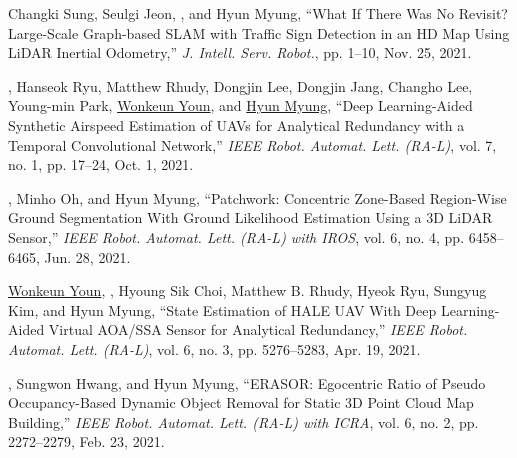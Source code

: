 \begin{pubSubsectionNum}
    \item Changki Sung, Seulgi Jeon, \hyungtaelim, and Hyun Myung, ``What If There Was No Revisit? Large-Scale Graph-based SLAM with Traffic Sign Detection in an HD Map Using LiDAR Inertial Odometry,'' \textit{J. Intell. Serv. Robot.}, pp. 1--10, Nov. 25, 2021.
    \item \hyungtaelim, Hanseok Ryu, Matthew Rhudy, Dongjin Lee, Dongjin Jang, Changho Lee, Young-min Park, \underline{Wonkeun Youn}, and \underline{Hyun Myung}, ``Deep Learning-Aided Synthetic Airspeed Estimation of UAVs for Analytical Redundancy with a Temporal Convolutional Network,'' \textit{IEEE Robot. Automat. Lett. (RA-L)}, vol. 7, no. 1, pp. 17--24, Oct. 1, 2021.
    \item \hyungtaelim, Minho Oh, and Hyun Myung, ``Patchwork: Concentric Zone-Based Region-Wise Ground Segmentation With Ground Likelihood Estimation Using a 3D LiDAR Sensor,'' \textit{IEEE Robot. Automat. Lett. (RA-L) with IROS}, vol. 6, no. 4, pp. 6458--6465, Jun. 28, 2021.
    \item \underline{Wonkeun Youn}, \underline{\hyungtaelim}, Hyoung Sik Choi, Matthew B. Rhudy, Hyeok Ryu, Sungyug Kim, and Hyun Myung, ``State Estimation of HALE UAV With Deep Learning-Aided Virtual AOA/SSA Sensor for Analytical Redundancy,'' \textit{IEEE Robot. Automat. Lett. (RA-L)}, vol. 6, no. 3, pp. 5276--5283, Apr. 19, 2021.
    \item \hyungtaelim, Sungwon Hwang, and Hyun Myung, ``ERASOR: Egocentric Ratio of Pseudo Occupancy-Based Dynamic Object Removal for Static 3D Point Cloud Map Building,'' \textit{IEEE Robot. Automat. Lett. (RA-L) with ICRA}, vol. 6, no. 2, pp. 2272--2279, Feb. 23, 2021.
\end{pubSubsectionNum}

